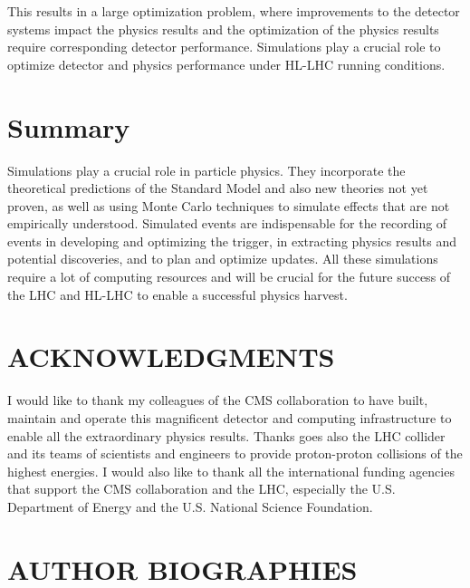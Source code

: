 \documentclass{wscpaperproc}
\theoremstyle{wsc}
\begin{document}
This results in a large optimization problem, where improvements to the detector systems impact the physics results and the optimization of the physics results require corresponding detector performance. Simulations play a crucial role to optimize detector and physics performance under HL-LHC running conditions. 

\section{Summary}
\label{sec:summary}

Simulations play a crucial role in particle physics. They incorporate the theoretical predictions of the Standard Model and also new theories not yet proven, as well as using Monte Carlo techniques to simulate effects that are not empirically understood. Simulated events are indispensable for the recording of events in developing and optimizing the trigger, in extracting physics results and potential discoveries, and to plan and optimize updates. All these simulations require a lot of computing resources and will be crucial for the future success of the LHC and HL-LHC to enable a successful physics harvest.

\section*{ACKNOWLEDGMENTS}
I would like to thank my colleagues of the CMS collaboration to have built, maintain and operate this magnificent detector and computing infrastructure to enable all the extraordinary physics results. Thanks goes also the LHC collider and its teams of scientists and engineers to provide proton-proton collisions of the highest energies. I would also like to thank all the international funding agencies that support the CMS collaboration and the LHC, especially the U.S. Department of Energy and the U.S. National Science Foundation.

\appendix





\section*{AUTHOR BIOGRAPHIES}
\end{document}
